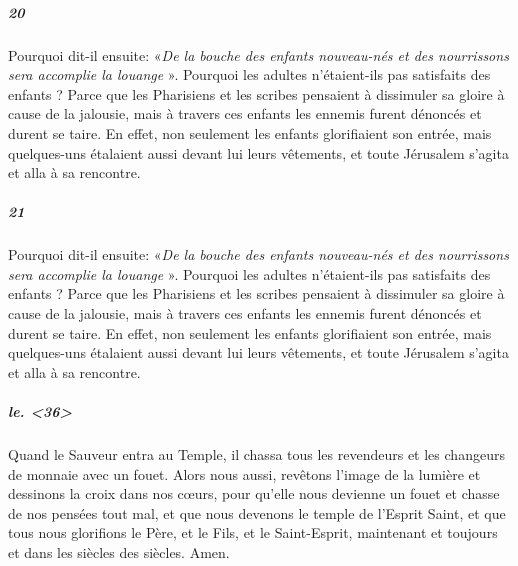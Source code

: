 \documentclass[a4paper]{article}
\begin{document}
    \resumenumbering
    

 


            \pstart
\subparagraph{20}\sloppy
Pourquoi dit-il ensuite: «\textit{De la bouche des enfants nouveau-nés et des nourrissons sera accomplie la louange}%
». Pourquoi les adultes n'étaient-ils pas satisfaits des enfants ? Parce que les Pharisiens et les scribes pensaient à dissimuler sa gloire à cause de la jalousie, mais à travers ces enfants les ennemis furent dénoncés et durent se taire. En effet, non seulement les enfants glorifiaient son entrée, mais quelques-uns étalaient aussi devant lui leurs vêtements, et toute Jérusalem s'agita et alla à sa rencontre.  
        \pend
    \pausenumbering

\begin{pairs}
\begin{Leftside} 
    \resumenumbering
    
    \pstart
\subparagraph{21}\sloppy
Pourquoi dit-il ensuite: «\textit{De la bouche des enfants nouveau-nés et des nourrissons sera accomplie la louange}%
». Pourquoi les adultes n'étaient-ils pas satisfaits des enfants ? Parce que les Pharisiens et les scribes pensaient à dissimuler sa gloire à cause de la jalousie, mais à travers ces enfants les ennemis furent dénoncés et durent se taire. En effet, non seulement les enfants glorifiaient son entrée, mais quelques-uns étalaient aussi devant lui leurs vêtements, et toute Jérusalem s'agita et alla à sa rencontre.  
        \pend

        \endnumbering

\end{Leftside}

\begin{Rightside} 
    \resumenumbering
     
               
        \pstart
        \subparagraph{le. <36>}\sloppy
Quand le Sauveur entra au Temple, il chassa tous les revendeurs et les changeurs de monnaie avec un fouet. Alors nous aussi, revêtons l'image de la lumière et dessinons la croix dans nos cœurs, pour qu'elle nous devienne un fouet et chasse de nos pensées tout mal, et que nous devenons le temple de l'Esprit Saint, et que tous nous glorifions le Père, et le Fils, et le Saint-Esprit, maintenant et toujours et dans les siècles des siècles. Amen. 
        \pend
        
\endnumbering
\end{Rightside}
\Columns


\end{pairs}
\end{document}
